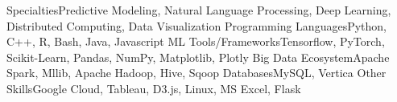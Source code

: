 \vspace{-2mm}
\vspace{-3.5mm}
\begin{cvskills}
\cvskill
{Specialties}{Predictive Modeling, Natural Language Processing, Deep Learning, Distributed Computing, Data Visualization}
\cvskill
{Programming Languages}{Python, C++, R, Bash, Java, Javascript}
\cvskill
{ML Tools/Frameworks}{Tensorflow, PyTorch, Scikit-Learn, Pandas, NumPy, Matplotlib, Plotly}
\cvskill
{Big Data Ecosystem}{Apache Spark, Mllib, Apache Hadoop, Hive, Sqoop}
\cvskill
{Databases}{MySQL, Vertica}
\cvskill
{Other Skills}{Google Cloud, Tableau, D3.js, Linux, MS Excel, Flask}
\end{cvskills}
